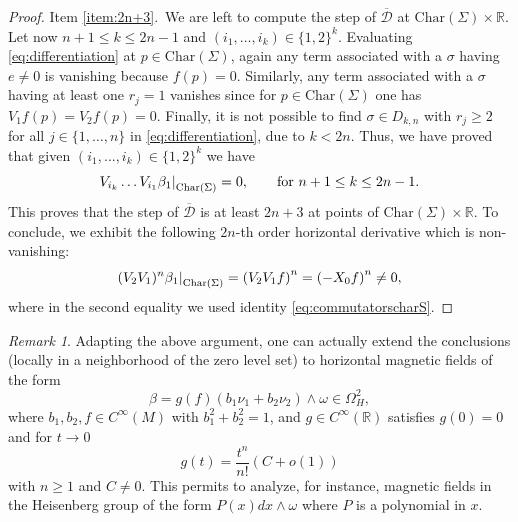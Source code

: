 \documentclass{amsart}
\theoremstyle{plain}
\theoremstyle{definition}
\theoremstyle{remark}
\newtheorem{remark}[thm]{Remark}
\newcommand{\R}{\mathbb{R}}
\newcommand{\distr}{\mathcal{D}}								%
\newcommand{\B}{\beta}
\newcommand{\lift}[1]{\overline{#1}} 							%
\newcommand\restr[2]{{													%
  \left.\kern-\nulldelimiterspace 					
  #1 																			
  \right|_{#2} 														
  }}
\begin{document}
\begin{proof}
Item \ref{item:2n+3}.\
We are left to compute the step of $\lift\distr $ at ${\mathrm{Char}(\Sigma)}\times\R$. %
Let now $n+1\leq k \leq 2n-1$ and $(i_1,\ldots,i_k)\in\{1,2\}^k$. 
Evaluating \eqref{eq:differentiation} at $p\in\mathrm{Char}(\Sigma)$, again any term associated with a $\sigma$ having $e\neq 0$ is vanishing because $f(p)=0$. 
Similarly, any term associated with a $\sigma$ having at least one $r_{j}=1$ vanishes since for $p\in \mathrm{Char}(\Sigma)$ one has $V_{1}f(p)=V_{2}f(p)=0$. 
Finally, it is not possible to find $\sigma\in D_{k,n}$ with $r_{j}\geq 2$ for all $j\in\{1,\ldots, n\}$ in \eqref{eq:differentiation}, due to $k< 2n$.
Thus, we have proved that given $(i_1,\ldots,i_k)\in\{1,2\}^k$ we have
\begin{equation}
\restr{ V_{i_k}\ldots V_{i_1}\B_1}{\mathrm{Char}(\Sigma)}=0, \qquad \text{for}\  n+1\leq k\leq 2n-1.
\end{equation}
This proves that the step of $\lift\distr $ is at least $2n+3$ at points of ${\mathrm{Char}(\Sigma)}\times\R$.
To conclude, we exhibit the following $2n$-th order horizontal derivative which is non-vanishing:
\begin{equation}
\restr{(V_2V_1)^{n}\B_1}{{\mathrm{Char}(\Sigma)}}=\left(V_2 V_1f\right)^n=\left(-X_0f\right)^n\neq 0,
\end{equation}
where in the second equality we used identity \eqref{eq:commutatorscharS}.
\end{proof}





\begin{remark}
Adapting the above argument, one can actually extend the conclusions (locally in a neighborhood of the zero level set) to horizontal magnetic fields of the form
\begin{equation}
\B=g(f)(b_1\nu_1+b_2\nu_2)\wedge\omega\in \Omega^2_H,
\end{equation}
where $b_1,b_2,f\in C^\infty(M)$ with $b_1^2+b_2^2=1$, and $g\in C^\infty(\R)$ satisfies $g(0)=0$ and  for $t\to 0$ 
\begin{equation}
	g(t)=\frac{t^n}{n!}(C+o(1))
\end{equation}  
with $n\geq 1$ and $C\neq 0$. 
This permits to analyze, for instance, magnetic fields in the Heisenberg group of the form $P(x)dx\wedge\omega$ where $P$ is a polynomial in $x$.
\end{remark}
\end{document}
